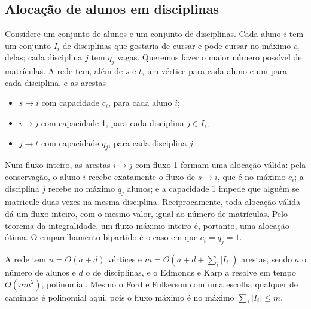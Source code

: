 \subsection{Alocação de alunos em disciplinas}\label{sec:alocacao}
Considere um conjunto de alunos e um conjunto de disciplinas. Cada aluno $i$ tem um conjunto $I_i$ de disciplinas que gostaria de cursar e pode cursar no máximo $c_i$ delas; cada disciplina $j$ tem $q_j$ vagas. Queremos fazer o maior número possível de matrículas. A rede tem, além de $s$ e $t$, um vértice para cada aluno e um para cada disciplina, e as arestas
\begin{itemize}
  \item $s\to i$ com capacidade $c_i$, para cada aluno $i$;
  \item $i\to j$ com capacidade 1, para cada disciplina $j\in I_i$;
  \item $j\to t$ com capacidade $q_j$, para cada disciplina $j$.
\end{itemize}
Num fluxo inteiro, as arestas $i\to j$ com fluxo 1 formam uma alocação válida: pela conservação, o aluno $i$ recebe exatamente o fluxo de $s\to i$, que é no máximo $c_i$; a disciplina $j$ recebe no máximo $q_j$ alunos; e a capacidade 1 impede que alguém se matricule duas vezes na mesma disciplina. Reciprocamente, toda alocação válida dá um fluxo inteiro, com o mesmo valor, igual ao número de matrículas. Pelo teorema da integralidade, um fluxo máximo inteiro é, portanto, uma alocação ótima. O emparelhamento bipartido é o caso em que $c_i=q_j=1$.

A rede tem $n=O(a+d)$ vértices e $m=O(a+d+\sum_i|I_i|)$ arestas, sendo $a$ o número de alunos e $d$ o de disciplinas, e o Edmonds e Karp a resolve em tempo $O(nm^2)$, polinomial. Mesmo o Ford e Fulkerson com uma escolha qualquer de caminhos é polinomial aqui, pois o fluxo máximo é no máximo $\sum_i|I_i|\le m$.


